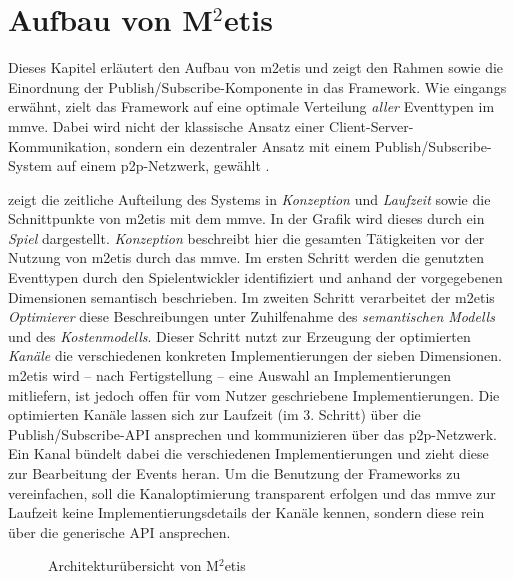 \section{Aufbau von M$^2$etis}
\label{chap:aufbau_metis}
Dieses Kapitel erläutert den Aufbau von \ac{m2etis} und zeigt den Rahmen sowie die Einordnung der Publish/Subscribe-Komponente in das Framework. Wie eingangs erwähnt, zielt das Framework auf eine optimale Verteilung \emph{aller} Eventtypen im \ac{mmve}. Dabei wird nicht der klassische Ansatz einer Client-Server-Kommunikation, sondern ein dezentraler Ansatz mit einem Publish/Subscribe-System auf einem \ac{p2p}-Netzwerk, gewählt \cite{Fischer2010a}.

 zeigt die zeitliche Aufteilung des Systems in \emph{Konzeption} und \emph{Laufzeit} sowie die Schnittpunkte von \ac{m2etis} mit dem \ac{mmve}. In der Grafik wird dieses durch ein \emph{Spiel} dargestellt. \emph{Konzeption} beschreibt hier die gesamten Tätigkeiten vor der Nutzung von \ac{m2etis} durch das \ac{mmve}. Im ersten Schritt werden die genutzten Eventtypen durch den Spielentwickler identifiziert und anhand der vorgegebenen Dimensionen semantisch beschrieben. Im zweiten Schritt verarbeitet der \ac{m2etis} \emph{Optimierer} diese Beschreibungen unter Zuhilfenahme des \emph{semantischen Modells} und des \emph{Kostenmodells}. Dieser Schritt nutzt zur Erzeugung der optimierten \emph{Kanäle} die verschiedenen konkreten Implementierungen der sieben Dimensionen. \ac{m2etis} wird -- nach Fertigstellung -- eine Auswahl an Implementierungen mitliefern, ist jedoch offen für vom Nutzer geschriebene Implementierungen.
Die optimierten Kanäle lassen sich zur Laufzeit (im 3. Schritt) über die Publish/Subscribe-API ansprechen und kommunizieren über das \ac{p2p}-Netzwerk. Ein Kanal bündelt dabei die verschiedenen Implementierungen und zieht diese zur Bearbeitung der Events heran. Um die Benutzung der Frameworks zu vereinfachen, soll die Kanaloptimierung transparent erfolgen und das \ac{mmve} zur Laufzeit keine Implementierungsdetails der Kanäle kennen, sondern diese rein über die generische API ansprechen.


\begin{figure}[htbp]
\centering
{}
\caption{Architekturübersicht von M$^2$etis}
\label{fig:metis_aufbau}
\end{figure}


